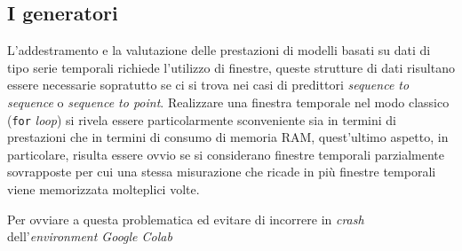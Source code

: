 \documentclass[12pt,a4paper,fleqn]{article}
\begin{document}
\subsection{I generatori}
L'addestramento e la valutazione delle prestazioni di modelli basati su dati di tipo serie temporali richiede l'utilizzo di finestre, queste strutture di dati risultano essere necessarie sopratutto se ci si trova nei casi di predittori \textsl{sequence to sequence} o \textsl{sequence to point}. Realizzare una finestra temporale nel modo classico (\texttt{for} \textit{loop}) si rivela essere particolarmente sconveniente sia in termini di prestazioni che in termini di consumo di memoria RAM, quest'ultimo aspetto, in particolare, risulta essere ovvio se si considerano finestre temporali parzialmente sovrapposte per cui una stessa misurazione che ricade in più finestre temporali viene memorizzata molteplici volte.

Per ovviare a questa problematica ed evitare di incorrere in \textsl{crash} dell'\textsl{environment Google Colab}


\end{document}

